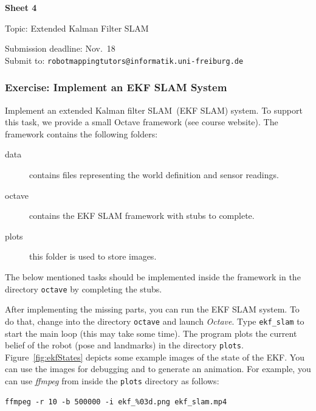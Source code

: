 \documentclass[12pt,a4paper]{article}
\begin{document}


\begin{center}
{\bf \Large Sheet 4}

{\large Topic: Extended Kalman Filter SLAM}

Submission deadline: Nov.~18\\
Submit to: \texttt{robotmappingtutors@informatik.uni-freiburg.de}
\end{center}

\subsubsection*{Exercise: Implement an EKF SLAM System}

Implement an extended Kalman filter SLAM~(EKF SLAM) system.  To support
this task, we provide a small Octave framework (see course website).
The framework contains the following folders:

\begin{description}
\item [data]  contains files representing the world definition and
    sensor readings.
\item [octave]  contains the EKF SLAM framework with
    stubs  to complete.
\item [plots] this folder is used to store images.
\end{description}

The below mentioned tasks should be implemented inside the framework
in the directory \texttt{octave} by completing the stubs.

After implementing the missing parts, you can run the EKF SLAM system.
To do that, change into the directory \texttt{octave} and launch
\emph{Octave}. Type \texttt{ekf\_slam} to start the main loop (this may
take some time). The program plots the current belief of the robot (pose
and landmarks) in the directory \texttt{plots}.
Figure~\ref{fig:ekfStates} depicts some example images of the state of
the EKF. You can use the images for debugging and to generate an
animation. For example, you can use \emph{ffmpeg} from inside the
\texttt{plots} directory as follows:
\begin{verbatim}
ffmpeg -r 10 -b 500000 -i ekf_%03d.png ekf_slam.mp4
\end{verbatim}
\end{document}
